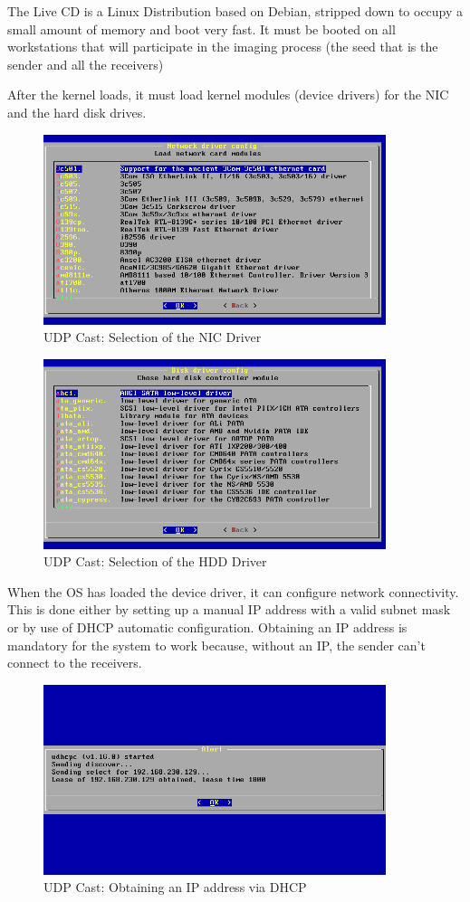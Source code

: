 The Live CD is a Linux Distribution based on Debian, stripped down to
occupy a small amount of memory and boot very fast. It must be booted on
all workstations that will participate in the imaging process (the seed
that is the sender and all the receivers)

After the kernel loads, it must load kernel modules (device drivers)
for the \ac{NIC} and the hard disk drives.

\begin{figure}[h]
\includegraphics[width=10cm]{img/udpcast_net_module}
\caption{UDP Cast: Selection of the \ac{NIC} Driver}
\label{fig:udpcast_net_module}
\end{figure}



\begin{figure}[h]
\includegraphics[width=10cm]{img/udpcast_hdd_module}
\caption{UDP Cast: Selection of the \ac{HDD} Driver}
\label{fig:udpcast_hdd_module}
\end{figure}


When the \ac{OS} has loaded the device driver, it can configure
network connectivity. This is done either by setting up a manual IP address
with a valid subnet mask or by use of \ac{DHCP} automatic configuration.
Obtaining an IP address is mandatory for the system to work because,
without an IP, the sender can't connect to the receivers.


\begin{figure}[h]
\includegraphics[width=10cm]{img/udpcast_dhcp}
\caption{UDP Cast: Obtaining an IP address via \ac{DHCP}}
\label{fig:udpcast_dhcp}
\end{figure}


